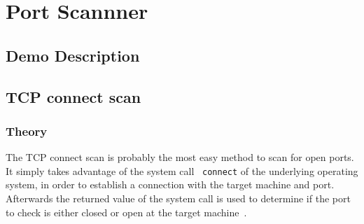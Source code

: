 \chapter{Port Scannner}

\section{Demo Description}


\section{TCP connect scan}
\label{sec:connect}
\subsection{Theory}
The TCP connect scan is probably the most easy method to scan for open ports. It simply takes advantage of the system call
~\lstinline|connect| of the underlying operating system, in order to establish a connection with the target machine and port. Afterwards the
returned value of the system call is used to determine if the port to check is either closed or open at the target machine~\cite{nmap2009}.



